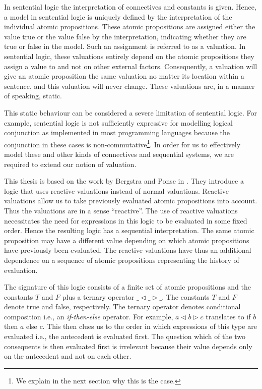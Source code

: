 \documentclass[a4paper,twoside,openright]{report}
\newcommand{\lef}{\ensuremath{\triangleleft}}
\newcommand{\rig}{\ensuremath{\triangleright}}
\begin{document}
In sentential logic the interpretation of connectives and constants is given. Hence, a model in sentential logic is uniquely defined by the interpretation of the individual atomic propositions. These atomic propositions are assigned either the value true or the value false by the interpretation, indicating whether they are true or false in the model. Such an assignment is referred to as a valuation. In sentential logic, these valuations entirely depend on the atomic propositions they assign a value to and not on other external factors. Consequently, a valuation will give an atomic proposition the same valuation no matter its location within a sentence, and this valuation will never change. These valuations are, in a manner of speaking, static.

This static behaviour can be considered a severe limitation of sentential logic. For example, sentential logic is not sufficiently expressive for modelling logical conjunction as implemented in most programming languages because the conjunction in these cases is non-commutative\footnote{We explain in the next section why this is the case.}. In order for us to effectively model these and other kinds of connectives and sequential systems, we are required to extend our notion of valuation.

This thesis is based on the work by Bergstra and Ponse in \cite{main}. They introduce a logic that uses reactive valuations instead of normal valuations. Reactive valuations allow us to take previously evaluated atomic propositions into account. Thus the valuations are in a sense ``reactive''. The use of reactive valuations necessitates the need for expressions in this logic to be evaluated in some fixed order. Hence the resulting logic has a sequential interpretation. The same atomic proposition may have a different value depending on which atomic propositions have previously been evaluated. The reactive valuations have thus an additional dependence on a sequence of atomic propositions representing the history of evaluation.

The signature of this logic consists of a finite set of atomic propositions and the constants $T$ and $F$ plus a ternary operator $\_\lef\_\rig\_$. The constants $T$ and $F$ denote true and false, respectively. The ternary operator denotes conditional composition i.e., an \emph{if-then-else} operator. For example, $a\lef b\rig c$ translates to if $b$ then $a$ else $c$. This then clues us to the order in which expressions of this type are evaluated i.e., the antecedent is evaluated first. The question which of the two consequents is then evaluated first is irrelevant because their value depends only on the antecedent and not on each other.
\end{document}
